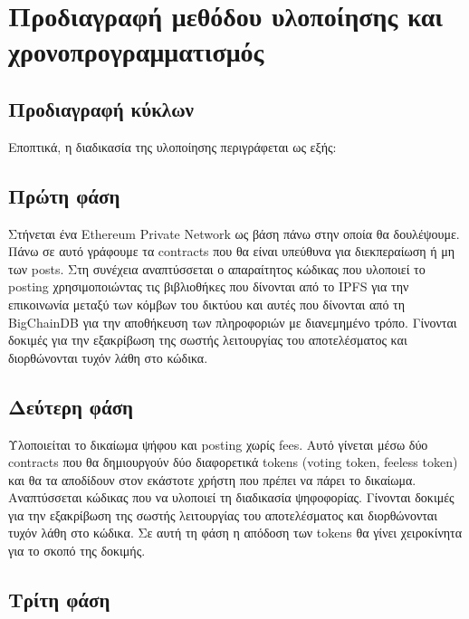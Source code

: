 \section{Προδιαγραφή μεθόδου υλοποίησης και χρονοπρογραμματισμός} \label{section:3-8-implementation-methodology-specification}


\subsection{Προδιαγραφή κύκλων}

Εποπτικά, η διαδικασία της υλοποίησης περιγράφεται ως εξής:


\subsection{Πρώτη φάση}

Στήνεται ένα Ethereum Private Network ως βάση πάνω στην οποία θα δουλέψουμε. Πάνω σε αυτό γράφουμε τα contracts που θα είναι υπεύθυνα για διεκπεραίωση ή μη των posts.
Στη συνέχεια αναπτύσσεται ο απαραίτητος κώδικας που υλοποιεί το posting χρησιμοποιώντας τις βιβλιοθήκες που δίνονται από το IPFS για την επικοινωνία μεταξύ των κόμβων του δικτύου και αυτές που δίνονται από τη BigChainDB για την αποθήκευση των πληροφοριών με διανεμημένο τρόπο.
Γίνονται δοκιμές για την εξακρίβωση της σωστής λειτουργίας του αποτελέσματος και διορθώνονται τυχόν λάθη στο κώδικα.

\subsection{Δεύτερη φάση}

Υλοποιείται το δικαίωμα ψήφου και posting χωρίς fees. Αυτό γίνεται μέσω δύο contracts που θα δημιουργούν δύο διαφορετικά tokens (voting token, feeless token) και θα τα αποδίδουν στον εκάστοτε χρήστη που πρέπει να πάρει το δικαίωμα.
Αναπτύσσεται κώδικας που να υλοποιεί τη διαδικασία ψηφοφορίας.
Γίνονται δοκιμές για την εξακρίβωση της σωστής λειτουργίας του αποτελέσματος και διορθώνονται τυχόν λάθη στο κώδικα. Σε αυτή τη φάση η απόδοση των tokens θα γίνει χειροκίνητα για το σκοπό της δοκιμής.

\subsection{Τρίτη φάση}

